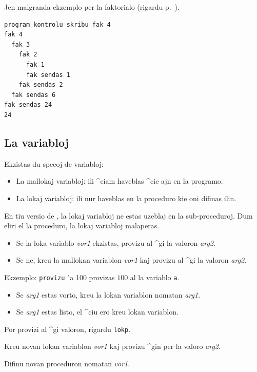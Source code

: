 Jen malgranda ekzemplo per la faktorialo (rigardu p.~\pageref{factorielle}).
\begin{verbatim}
program_kontrolu skribu fak 4
fak 4
  fak 3
    fak 2
      fak 1
      fak sendas 1
    fak sendas 2
  fak sendas 6
fak sendas 24
24
\end{verbatim}

\subsection{La variabloj} 

Ekzistas du specoj de variabloj:
\begin{itemize}
\item La mallokaj variabloj: ili ^ciam haveblas ^cie ajn en la
  programo.
\item La lokaj variabloj: ili nur haveblas en la proceduro kie oni
  difinas ilin.
\end{itemize}

En tiu versio de \logo, la lokaj variabloj ne estas uzeblaj en la
sub-proceduroj.  Dum eliri el la proceduro, la lokaj variabloj
malaperas.

\begin{itemize}
\item Se la loka variablo \textit{vor1} ekzistas, provizu al ^gi la
  valoron \textit{arg2}.
\item Se ne, kreu la mallokan variablon \textit{vor1} kaj provizu al
  ^gi la valoron \textit{arg2}.
\end{itemize}

Ekzemplo: \texttt{provizu} {}"a 100 provizas $100$ al la variablo
\texttt{a}.

\begin{itemize}
\item Se \textit{arg1} estas vorto, kreu la lokan variablon nomatan
  \textit{arg1}.
\item Se \textit{arg1} estas listo, el ^ciu ero kreu lokan variablon.
\end{itemize}
Por provizi al ^gi valoron, rigardu \texttt{lokp}.


Kreu novan lokan variablon \textit{vor1} kaj provizu ^gin per la
valoro \textit{arg2}.


Difinu novan proceduron nomatan \textit{vor1}.

